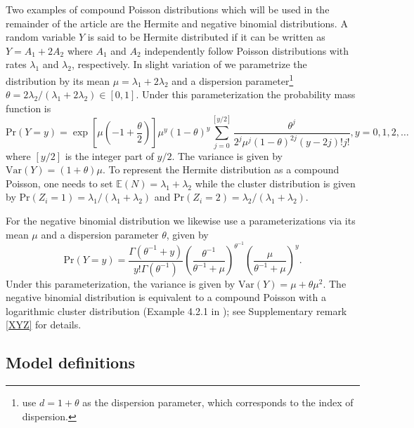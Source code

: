 \documentclass{article}
\begin{document}
Two examples of compound Poisson distributions which will be used in the remainder of the article are the Hermite and negative binomial distributions. A random variable $Y$ is said to be Hermite distributed if it can be written as $Y = A_1 + 2A_2$ where $A_1$ and $A_2$ independently follow Poisson distributions with rates $\lambda_1$ and $\lambda_2$, respectively. In slight variation of \cite{Gupta1974} we parametrize the distribution by its mean $\mu = \lambda_1 + 2\lambda_2$ and a dispersion parameter\footnote{\cite{Gupta1974} use $d = 1 + \theta$ as the dispersion parameter, which corresponds to the index of dispersion.} $\theta = 2\lambda_2/(\lambda_1 + 2\lambda_2) \in [0, 1]$. Under this parameterization the probability mass function is
$$
\text{Pr}(Y = y) = \exp\left[\mu\left(-1 + \frac{\theta}{2}\right)\right] \mu^y(1 - \theta)^y \sum_{j = 0}^{[y/2]} \frac{\theta^j}{2^j\mu^j(1 - \theta)^{2j}(y - 2j)!j!}, y = 0, 1, 2, \dots
$$
where $[y/2]$ is the integer part of $y/2$. The variance is given by $\text{Var}(Y) = (1 + \theta)\mu$. To represent the Hermite distribution as a compound Poisson, one needs to set $\mathbb{E}(N) = \lambda_1 + \lambda_2$ while the cluster distribution is given by $\text{Pr}(Z_i = 1) = \lambda_1/(\lambda_1 + \lambda_2)$ and $\text{Pr}(Z_i = 2) = \lambda_2/(\lambda_1 + \lambda_2)$.

For the negative binomial distribution we likewise use a parameterizations via its mean $\mu$ and a dispersion parameter $\theta$, given by
$$
\text{Pr}(Y = y) = \frac{\Gamma(\theta^{-1} + y)}{y!\Gamma(\theta^{-1})} \left(\frac{\theta^{-1}}{\theta^{-1} + \mu}\right)^{\theta^{-1}} \left(\frac{\mu}{\theta^{-1} + \mu}\right)^y.
$$
Under this parameterization, the variance is given by $\text{Var}(Y) = \mu + \theta\mu^2$. The negative binomial distribution is equivalent to a compound Poisson with a logarithmic cluster distribution (Example 4.2.1 in \cite{Weiss2018}); see Supplementary remark \ref{XYZ} for details. %

\subsection{Model definitions}
\end{document}
